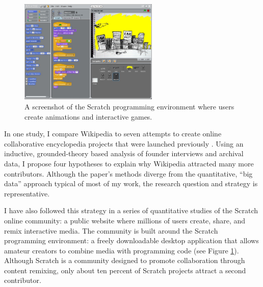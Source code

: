 \documentclass[10pt]{memoir}
\begin{document}

\begin{figure}
 \begin{centering}
 \includegraphics[width=2.6in]{figures/scratch_screenshot_default.jpg}
 \caption{A screenshot of the Scratch programming environment
   where users create animations and interactive games.}
 \label{fig:scratchapp}
 \end{centering}
 \vspace{-2em}
\end{figure}

In one study, I compare Wikipedia to seven attempts to create online
collaborative encyclopedia projects that were launched previously
\cite{hill_almost_2012}. Using an inductive, grounded-theory based
analysis of founder interviews and archival data, I propose four
hypotheses to explain why Wikipedia attracted many more
contributors. Although the paper's methods diverge from the
quantitative, ``big data'' approach typical of most of my work, the
research question and strategy is representative.

I have also followed this strategy in a series of quantitative studies
of the Scratch online community: a public website where millions
of users create, share, and remix interactive media. The
community is built around the Scratch programming environment: a
freely downloadable desktop application that allows amateur creators
to combine media with programming code (see Figure
\ref{fig:scratchapp}). Although Scratch is a community designed to
promote collaboration through content remixing, only about ten percent
of Scratch projects attract a second contributor.
\end{document}
